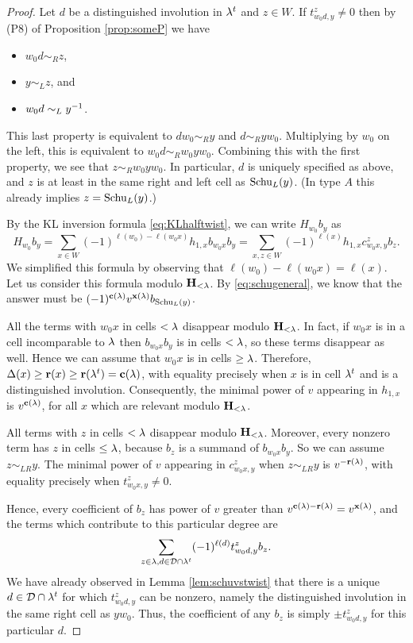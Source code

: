 \begin{proof} Let $d$ be a distinguished involution in $\lambda^t$ and $z \in W$. If $t_{w_0 d, y}^z \ne 0$ then by (P8) of Proposition \ref{prop:someP} we have \begin{itemize} \item $w_0 d
\sim_R z$, \item $y \sim_L z$, and \item $w_0 d \sim_L y^{-1}$. \end{itemize} This last property is equivalent to $d w_0 \sim_R y$ and $d \sim_R y w_0$. Multiplying by $w_0$ on the left,
this is equivalent to $w_0 d \sim_R w_0 y w_0$. Combining this with the first property, we see that $z \sim_R w_0 y w_0$. In particular, $d$ is uniquely specified as above, and $z$ is at
least in the same right and left cell as $\operatorname{Schu}_L(y)$. (In type $A$ this already implies $z = \operatorname{Schu}_L(y)$.)

By the KL inversion formula \eqref{eq:KLhalftwist}, we can write $H_{w_0} b_y$ as
\begin{equation} H_{w_0} b_y = \sum_{x \in W} (-1)^{\ell(w_0) - \ell(w_0 x)} h_{1, x} b_{w_0 x} b_y = \sum_{x, z \in W} (-1)^{\ell(x)} h_{1, x} c_{w_0 x,y}^z b_z. \end{equation}
We simplified this formula by observing that $\ell(w_0) - \ell(w_0 x) = \ell(x)$. Let us consider this formula modulo ${\mathbf H}_{< \lambda}$. By \eqref{eq:schugeneral}, we know that the answer must be $(-1)^{\mathbf{c}(\lambda)} v^{\mathbf{x}(\lambda)} b_{\operatorname{Schu}_L(y)}$.

All the terms with $w_0 x$ in cells $< \lambda$ disappear modulo ${\mathbf H}_{< \lambda}$. In fact, if $w_0 x$ is in a cell incomparable to $\lambda$ then $b_{w_0 x} b_y$ is in cells $< \lambda$, so these terms
disappear as well. Hence we can assume that $w_0 x$ is in cells $\ge \lambda$. Therefore, $\Delta(x) \ge \mathbf{r}(x) \ge \mathbf{r}(\lambda^t) = \mathbf{c}(\lambda)$, with equality precisely when $x$ is in cell $\lambda^t$ and
is a distinguished involution. Consequently, the minimal power of $v$ appearing in $h_{1,x}$ is $v^{\mathbf{c}(\lambda)}$, for all $x$ which are relevant modulo ${\mathbf H}_{< \lambda}$.

All terms with $z$ in cells $< \lambda$ disappear modulo ${\mathbf H}_{< \lambda}$. Moreover, every nonzero term has $z$ in cells $\le \lambda$, because $b_z$ is a summand of $b_{w_0 x} b_y$. So we can assume
$z \sim_{LR} y$. The minimal power of $v$ appearing in $c_{w_0 x,y}^z$ when $z \sim_{LR} y$ is $v^{-\mathbf{r}(\lambda)}$, with equality precisely when $t_{w_0 x,y}^z \ne 0$.

Hence, every coefficient of $b_z$ has power of $v$ greater than $v^{\mathbf{c}(\lambda) - \mathbf{r}(\lambda)} = v^{\mathbf{x}(\lambda)}$, and the terms which contribute to this particular degree are \begin{equation}
\sum_{z \in \lambda, \\ d \in {\mathcal{D}} \cap \lambda^t} (-1)^{\ell(d)} t_{w_0 d, y}^z b_z. \end{equation} We have already observed in Lemma \ref{lem:schuvstwist} that there is a unique $d \in {\mathcal{D}} \cap
\lambda^t$ for which $t_{w_0 d,y}^z$ can be nonzero, namely the distinguished involution in the same right cell as $y w_0$. Thus, the coefficient of any $b_z$ is simply $\pm t_{w_0 d,y}^z$
for this particular $d$.


\end{proof}
